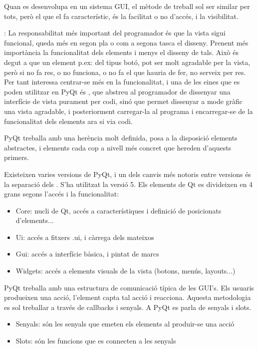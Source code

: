 \documentclass[letterpaper,11pt,catalan]{sphinxmanual}
\begin{document}
Quan es desenvolupa en un sistema GUI, el mètode de treball sol ser similar per tots, però el que
el fa característic, és la facilitat o no d'accés, i la visibilitat.

: La responsabilitat més important del programador és que la vista sigui funcional,
queda més en segon pla o com a segona tasca el disseny. Prenent més importància la funcionalitat
dels elements i menys el disseny de tals. Això és degut a que un element p.ex: del tipus botó,
pot ser molt agradable per la vista, però si no fa res, o no funciona, o no fa el que hauria
de fer, no serveix per res. Per tant interessa centrar-se més en la funcionalitat, i una de les
eines que es poden utilitzar en PyQt és , que abstreu al programador de dissenyar una
interfície de vista purament per codi, sinó que permet dissenyar a mode gràfic una vista agradable,
i posteriorment carregar-la al programa i encarregar-se de la funcionalitat dels elements ara si
via codi.

PyQt treballa amb una herència molt definida, posa a la disposició elements abstractes, i elements
cada cop a nivell més concret que hereden d'aquests primers.

Existeixen varies versions de PyQt, i un dels canvis més notoris entre versions és la separació
dels . S'ha utilitzat la versió 5. Els elements de Qt es divideixen en 4 grans 
segons l'accés i la funcionalitat:
\begin{itemize}
\item {} 
Core: nucli de Qt, accés a característiques i definició de posicionats d'elements...

\item {} 
Ui: accés a fitxers .ui, i càrrega dels mateixos

\item {} 
Gui: accés a interfície bàsica, i pintat de marcs

\item {} 
Widgets: accés a elements visuals de la vista (botons, menús, layouts...)

\end{itemize}

PyQt treballa amb una estructura de comunicació típica de les GUI's. Els usuaris produeixen una acció,
l'element capta tal acció i reacciona. Aquesta metodologia es sol treballar a través de callbacks i senyals.
A PyQt es parla de senyals i slots.
\begin{itemize}
\item {} 
Senyals: són les senyals que emeten els elements al produir-se una acció

\item {} 
Slots: són les funcions que es connecten a les senyals

\end{itemize}
\end{document}
